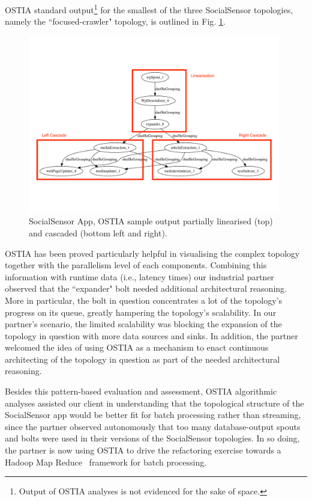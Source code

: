 OSTIA standard output\footnote{Output of OSTIA analyses is not evidenced for the
sake of space.} for the smallest of the three SocialSensor topologies, namely
the ``focused-crawler" topology, is outlined in Fig. \ref{topo1}.

\begin{figure}
\begin{center}
		\includegraphics[width=11cm]{images/output/focused_crawler}
		\caption{SocialSensor App, OSTIA sample output partially linearised (top) and cascaded (bottom left and right).}
		\label{topo1}
		\end{center}
\end{figure}

OSTIA has been proved particularly helpful in visualising the complex topology
together with the parallelism level of each components. Combining this
information with runtime data (i.e., latency times) our industrial partner observed
that the ``expander" bolt needed additional architectural reasoning. More in particular, the bolt in question concentrates a lot of the topology's progress on its queue, greatly hampering the topology's scalability. In our partner's scenario, the limited scalability was blocking the expansion of the topology in question with more data sources and sinks.
In addition, the partner welcomed the idea of using OSTIA as a mechanism to enact continuous
architecting of the topology in question as part of the needed architectural
reasoning.

Besides this pattern-based evaluation and assessment, OSTIA algorithmic analyses
assisted our client in understanding that the topological structure of the
SocialSensor app would be better fit for batch processing rather than streaming,
since the partner observed autonomously that too many database-output spouts and
bolts were used in their versions of the SocialSensor topologies. In so doing,
the partner is now using OSTIA to drive the refactoring exercise towards a
Hadoop Map Reduce~\cite{hadoop}
framework for batch processing.

